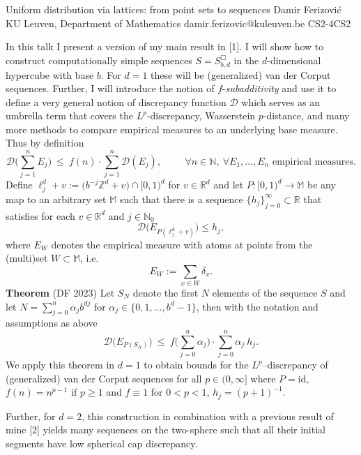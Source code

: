 	\begin{talk}
		{Uniform distribution via lattices: from point sets to sequences}%
		{Damir Ferizovi\'{c}}%
		{KU Leuven, Department of Mathematics}%
		{damir.ferizovic@kuleuven.be}%
		{}%
{}{}{CS2-4}{CS2}

		
		
		In this talk I present a version of my main result in [1]. I will show how to construct computationally simple sequences $S=S^\Box_{b,d}$ in the $d$-dimensional hypercube with base $b$. For $d=1$ these will be (generalized) van der Corput sequences. Further, I will introduce the notion of $f$-\textit{subadditivity}  and use it to define a very general notion of discrepancy function $\mathcal{D}$ which serves as an umbrella term that covers the $L^p$-discrepancy, Wasserstein $p$-distance,  and many more methods to compare empirical measures to an underlying base measure. Thus by definition
		\[
		\mathcal{D}\Big(\sum_{j=1}^{n}E_j\Big)\ \leq\ f(n)\cdot \sum_{j=1}^{n} \mathcal{D}(E_j), \hspace{1cm}\forall n\in\mathbb{N},\ \forall E_1,\ldots,E_n\mbox{ empirical measures}.
		\] 		
		Define $\ell^d_j+v:=\big(b^{-j} \mathbb{Z}^d+v\big)\cap[0,1)^d$ for $v\in\mathbb{R}^d$ and let $P:[0,1)^d\rightarrow \mathbb{M}$ be any map to an arbitrary set $\mathbb{M}$ such that there is a sequence $\{h_j\}_{j=0}^{\infty}\subset \mathbb{R}$ that satisfies  for each $v\in\mathbb{R}^d\mbox{ and }j\in\mathbb{N}_0$
		\[
			\mathcal{D}\big(E_{P(\ell^d_j+v)}\big)\leq h_j, 
		\]
		where  $E_W$ denotes the empirical measure with atoms at points from the (multi)set $W\subset \mathbb{M}$, i.e. 
		\[
			E_W:=\sum_{x\in W} \delta_x.
		\]
		\textbf{Theorem} (DF 2023) Let $S_N$ denote the first $N$ elements of the sequence $S$ and let  $N=\sum_{j=0}^{n}\alpha_j b^{dj}$ for $\alpha_j\in\{0,1,\ldots,b^d-1\}$, then with the notation and assumptions as above
		\[
			\mathcal{D}\big(E_{P(S_N)}\big)\ \leq\ f\Big(\sum_{j=0}^n\alpha_j\Big)\cdot \sum_{j=0}^{n}\alpha_j \ h_j.
		\]
		We apply this theorem in $d=1$ to obtain bounds for the $L^p$--discrepancy of (generalized) van der Corput sequences  for all $p\in(0,\infty]$ where $P=\mathrm{id}$, $f(n)=n^{p-1}$ if $p\geq 1$ and $f\equiv 1$ for $0<p<1$, $h_j=(p+1)^{-1}$. 
		
		Further, for $d=2$, this construction in combination with a previous result of mine [2] yields  many sequences on the two-sphere such that all their initial segments have low  spherical cap discrepancy.
		

\end{talk}
